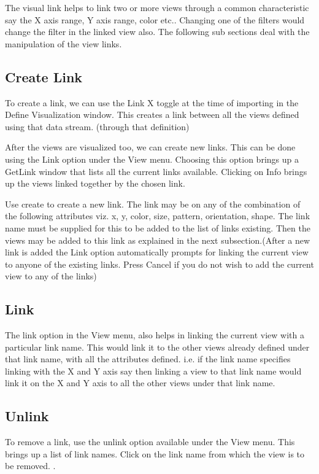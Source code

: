The visual link helps to link two or more views through a common characteristic say the X axis range, Y axis range, color etc.. Changing one of the filters would change the filter in the linked view also. The following sub sections deal with the manipulation of the view links.

\subsection{Create Link}

To create a link, we can use the Link X toggle at the time of importing in the Define Visualization window. This creates a link between all the views defined using that data stream. (through that definition) 

After the views are visualized too, we can create new links. This can be done using the Link option under the View menu. Choosing this option brings up a GetLink window that lists all the current links available. Clicking on Info brings up the views linked together by the chosen link. 

Use create to create a new link. The link may be on any of the combination of the following attributes viz. x, y, color, size, pattern, orientation, shape. The link name must be supplied for this to be added to the list of links existing. Then the views may be added to this link as explained in the next subsection.(After a new link is added the Link option automatically prompts for linking the current view to anyone of the existing links. Press Cancel if you do not wish to add the current view to any of the links) 

\subsection{Link}

The link option in the View menu, also helps in linking the current view with a particular link name. This would link it to the other views already defined under that link name, with all the attributes defined. i.e. if the link name specifies linking with the X and Y axis say then linking a view to that link name would link it on the X and Y axis to all the other views under that link name. 

\subsection{Unlink}

To remove a link, use the unlink option available under the View menu. This brings up a list of link names. Click on the link name from which the view is to be removed.
.
